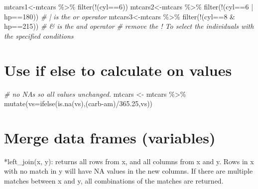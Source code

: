 \documentclass[
]{book}
\newenvironment{Shaded}{\begin{snugshade}}{\end{snugshade}}
\newcommand{\AttributeTok}[1]{\textcolor[rgb]{0.77,0.63,0.00}{#1}}
\newcommand{\CommentTok}[1]{\textcolor[rgb]{0.56,0.35,0.01}{\textit{#1}}}
\newcommand{\DecValTok}[1]{\textcolor[rgb]{0.00,0.00,0.81}{#1}}
\newcommand{\FloatTok}[1]{\textcolor[rgb]{0.00,0.00,0.81}{#1}}
\newcommand{\FunctionTok}[1]{\textcolor[rgb]{0.00,0.00,0.00}{#1}}
\newcommand{\NormalTok}[1]{#1}
\newcommand{\OtherTok}[1]{\textcolor[rgb]{0.56,0.35,0.01}{#1}}
\newcommand{\SpecialCharTok}[1]{\textcolor[rgb]{0.00,0.00,0.00}{#1}}
\begin{document}
\begin{Shaded}
\begin{Highlighting}[]
\NormalTok{mtcars1}\OtherTok{\textless{}{-}}\NormalTok{mtcars }\SpecialCharTok{\%\textgreater{}\%} \FunctionTok{filter}\NormalTok{(}\SpecialCharTok{!}\NormalTok{(cyl}\SpecialCharTok{==}\DecValTok{6}\NormalTok{))}
\NormalTok{mtcars2}\OtherTok{\textless{}{-}}\NormalTok{mtcars }\SpecialCharTok{\%\textgreater{}\%} \FunctionTok{filter}\NormalTok{(}\SpecialCharTok{!}\NormalTok{(cyl}\SpecialCharTok{==}\DecValTok{6} \SpecialCharTok{|}\NormalTok{ hp}\SpecialCharTok{==}\DecValTok{180}\NormalTok{)) }\CommentTok{\# | is the \textquotesingle{}or\textquotesingle{} operator}
\NormalTok{mtcars3}\OtherTok{\textless{}{-}}\NormalTok{mtcars }\SpecialCharTok{\%\textgreater{}\%} \FunctionTok{filter}\NormalTok{(}\SpecialCharTok{!}\NormalTok{(cyl}\SpecialCharTok{==}\DecValTok{8} \SpecialCharTok{\&}\NormalTok{ hp}\SpecialCharTok{==}\DecValTok{215}\NormalTok{)) }\CommentTok{\# \& is the \textquotesingle{}and\textquotesingle{} operator}
\CommentTok{\# remove the ! To select the individuals with the specified conditions}
\end{Highlighting}
\end{Shaded}

\hypertarget{use-if-else-to-calculate-on-values}{%
\section{Use if else to calculate on values}\label{use-if-else-to-calculate-on-values}}

\begin{Shaded}
\begin{Highlighting}[]
\CommentTok{\# no NA\textquotesingle{}s so all values unchanged.}
\NormalTok{mtcars }\OtherTok{\textless{}{-}}\NormalTok{ mtcars }\SpecialCharTok{\%\textgreater{}\%} \FunctionTok{mutate}\NormalTok{(}\AttributeTok{vs=}\FunctionTok{ifelse}\NormalTok{(}\FunctionTok{is.na}\NormalTok{(vs),(carb}\SpecialCharTok{{-}}\NormalTok{am)}\SpecialCharTok{/}\FloatTok{365.25}\NormalTok{,vs)) }
\end{Highlighting}
\end{Shaded}

\hypertarget{merge-data-frames-variables}{%
\section{Merge data frames (variables)}\label{merge-data-frames-variables}}

*left\_join(x, y): returns all rows from x, and all columns from x and y. Rows in x with no match in y will have NA values in the new columns. If there are multiple matches between x and y, all combinations of the matches are returned.
\end{document}
